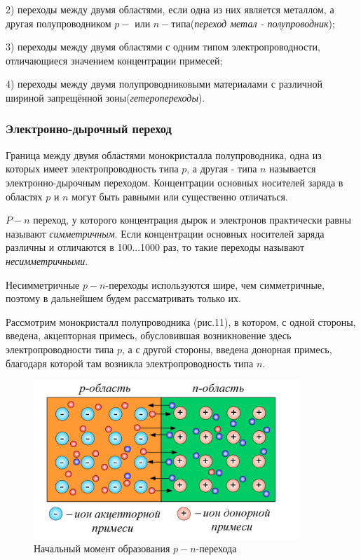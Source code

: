 	\par 2) переходы между двумя областями, если одна из них является металлом, а другая полупроводником \(p-\) или \(n-\)типа(\textit{переход метал - полупроводник});
	
	\par 3) переходы между двумя областями с одним типом электропроводности, отличающиеся значением концентрации примесей;
	
	\par 4) переходы между двумя полупроводниковыми материалами с различной шириной запрещённой зоны(\textit{гетеропереходы}).
	
	\subsubsection{Электронно-дырочный переход}
	
	\par Граница между двумя областями монокристалла полупроводника, одна из которых имеет электропроводность типа \(p\), а другая - типа \(n\) называется электронно-дырочным переходом. Концентрации основных носителей заряда в областях \(p\) и \(n\) могут быть равными или существенно отличаться.
	
	\par \(P-n\) переход, у которого концентрация дырок и электронов практически равны называют \textit{симметричным}. Если концентрации основных носителей заряда различны и отличаются в 100...1000 раз, то такие переходы называют \textit{несимметричными}.
	\par Несимметричные \(p-n\)-переходы используются шире, чем симметричные, поэтому в дальнейшем будем рассматривать только их.
	
	\par Рассмотрим монокристалл полупроводника (рис.11), в котором, с одной стороны, введена, акцепторная примесь, обусловившая возникновение здесь электропроводности типа \(p\), а с другой стороны, введена донорная примесь, благодаря которой там возникла электропроводность типа \(n\). 
	
	\begin{figure}[h]
		\centering
		\includegraphics[height=6cm]{img/12} 
		\captionsetup{font=footnotesize}
		\caption{Начальный момент образования \(p-n\)-перехода} 
	\end{figure}
	
